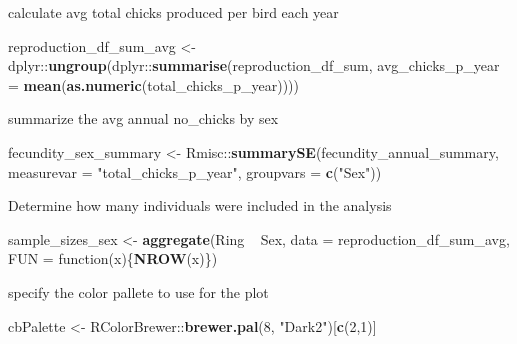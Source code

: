 \documentclass[]{article}
\newenvironment{Shaded}{\begin{snugshade}}{\end{snugshade}}
\newcommand{\KeywordTok}[1]{\textcolor[rgb]{0.13,0.29,0.53}{\textbf{{#1}}}}
\newcommand{\DataTypeTok}[1]{\textcolor[rgb]{0.13,0.29,0.53}{{#1}}}
\newcommand{\DecValTok}[1]{\textcolor[rgb]{0.00,0.00,0.81}{{#1}}}
\newcommand{\StringTok}[1]{\textcolor[rgb]{0.31,0.60,0.02}{{#1}}}
\newcommand{\NormalTok}[1]{{#1}}
\begin{document}
calculate avg total chicks produced per bird each year

\begin{Shaded}
\begin{Highlighting}[]
\NormalTok{reproduction_df_sum_avg <-}\StringTok{ }
\StringTok{  }\NormalTok{dplyr::}\KeywordTok{ungroup}\NormalTok{(dplyr::}\KeywordTok{summarise}\NormalTok{(reproduction_df_sum, }
                           \DataTypeTok{avg_chicks_p_year =} \KeywordTok{mean}\NormalTok{(}\KeywordTok{as.numeric}\NormalTok{(total_chicks_p_year))))}
\end{Highlighting}
\end{Shaded}

summarize the avg annual no\_chicks by sex

\begin{Shaded}
\begin{Highlighting}[]
\NormalTok{fecundity_sex_summary <-}\StringTok{ }
\StringTok{  }\NormalTok{Rmisc::}\KeywordTok{summarySE}\NormalTok{(fecundity_annual_summary, }
                   \DataTypeTok{measurevar =} \StringTok{"total_chicks_p_year"}\NormalTok{, }\DataTypeTok{groupvars =} \KeywordTok{c}\NormalTok{(}\StringTok{"Sex"}\NormalTok{))}
\end{Highlighting}
\end{Shaded}

Determine how many individuals were included in the analysis

\begin{Shaded}
\begin{Highlighting}[]
\NormalTok{sample_sizes_sex <-}\StringTok{ }
\StringTok{  }\KeywordTok{aggregate}\NormalTok{(Ring ~}\StringTok{ }\NormalTok{Sex, }\DataTypeTok{data =} \NormalTok{reproduction_df_sum_avg, }\DataTypeTok{FUN =} \NormalTok{function(x)\{}\KeywordTok{NROW}\NormalTok{(x)\})}
\end{Highlighting}
\end{Shaded}

specify the color pallete to use for the plot

\begin{Shaded}
\begin{Highlighting}[]
\NormalTok{cbPalette <-}\StringTok{ }\NormalTok{RColorBrewer::}\KeywordTok{brewer.pal}\NormalTok{(}\DecValTok{8}\NormalTok{, }\StringTok{"Dark2"}\NormalTok{)[}\KeywordTok{c}\NormalTok{(}\DecValTok{2}\NormalTok{,}\DecValTok{1}\NormalTok{)]}
\end{Highlighting}
\end{Shaded}
\end{document}
